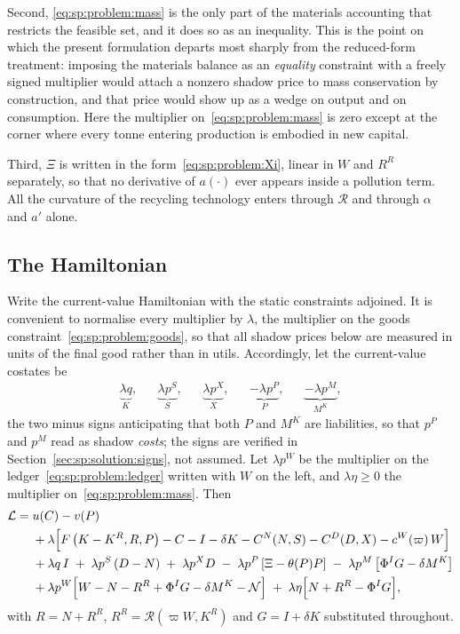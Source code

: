 Second, \eqref{eq:sp:problem:mass} is the only part of the materials accounting that restricts the
feasible set, and it does so as an inequality. This is the point on which the present formulation
departs most sharply from the reduced-form treatment: imposing the materials balance as an
\emph{equality} constraint with a freely signed multiplier would attach a nonzero shadow price to
mass conservation by construction, and that price would show up as a wedge on output and on
consumption. Here the multiplier on~\eqref{eq:sp:problem:mass} is zero except at the corner where
every tonne entering production is embodied in new capital.

Third, $\Xi$ is written in the form~\eqref{eq:sp:problem:Xi}, linear in $W$ and $R^R$ separately, so
that no derivative of $a(\cdot)$ ever appears inside a pollution term. All the curvature of the
recycling technology enters through $\mathcal R$ and through $\alpha$ and $a'$ alone.


\subsection{The Hamiltonian}\label{sec:sp:problem:hamiltonian}

Write the current-value Hamiltonian with the static constraints adjoined. It is convenient to
normalise every multiplier by $\lambda$, the multiplier on the goods
constraint~\eqref{eq:sp:problem:goods}, so that all shadow prices below are measured in units of the
final good rather than in utils. Accordingly, let the current-value costates be
\begin{align}
\underbrace{\lambda q}_{K},
&&
\underbrace{\lambda p^S}_{S},
&&
\underbrace{\lambda p^X}_{X},
&&
\underbrace{-\lambda p^P}_{P},
&&
\underbrace{-\lambda p^M}_{M^K},
\label{eq:sp:problem:costates}
\end{align}
the two minus signs anticipating that both $P$ and $M^K$ are liabilities, so that $p^P$ and $p^M$
read as shadow \emph{costs}; the signs are verified in
Section~\ref{sec:sp:solution:signs}, not assumed. Let $\lambda p^W$ be the multiplier on the
ledger~\eqref{eq:sp:problem:ledger} written with $W$ on the left, and $\lambda\eta\ge0$ the
multiplier on~\eqref{eq:sp:problem:mass}. Then
\begin{align}
\mathcal L
={}& u(C)-v(P)
\notag\\
&+\lambda\Big[F\left(K-K^R,R,P\right)-C-I-\delta K-C^N(N,S)-C^D(D,X)-c^W\!\left(\varpi\right)W\Big]
\notag\\
&+\lambda q\,I
\;+\;\lambda p^S\left(D-N\right)
\;+\;\lambda p^X D
\;-\;\lambda p^P\left[\Xi-\theta(P)P\right]
\;-\;\lambda p^M\left[\Phi^IG-\delta M^K\right]
\notag\\
&+\lambda p^W\Big[W-N-R^R+\Phi^IG-\delta M^K-\mathcal N\Big]
\;+\;\lambda\eta\Big[N+R^R-\Phi^IG\Big],
\label{eq:sp:problem:lagrangian}
\end{align}
with $R=N+R^R$, $R^R=\mathcal R\left(\varpi W,K^R\right)$ and $G=I+\delta K$ substituted throughout.

